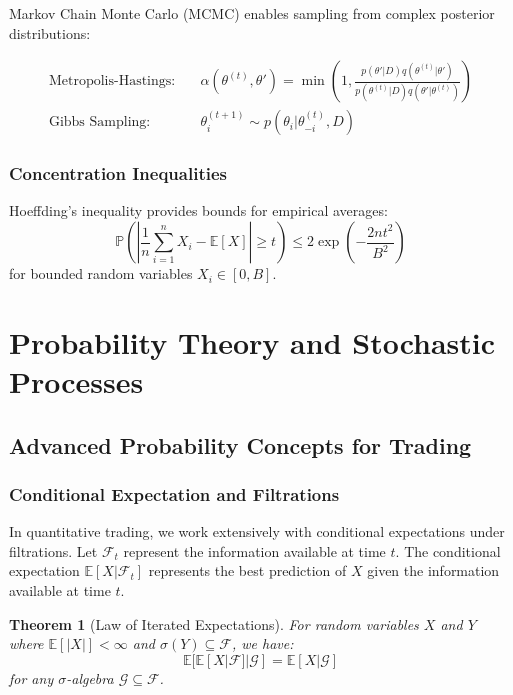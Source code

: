 \documentclass[11pt,letterpaper,openany]{book}
\newtheorem{theorem}{Theorem}[chapter]
\begin{document}
Markov Chain Monte Carlo (MCMC) enables sampling from complex posterior distributions:

\begin{align}
\text{Metropolis-Hastings:} \quad & \alpha(\theta^{(t)}, \theta') = \min\left(1, \frac{p(\theta'|D) q(\theta^{(t)}|\theta')}{p(\theta^{(t)}|D) q(\theta'|\theta^{(t)})}\right) \\
\text{Gibbs Sampling:} \quad & \theta_i^{(t+1)} \sim p(\theta_i | \theta_{-i}^{(t)}, D)
\end{align}

\subsubsection{Concentration Inequalities}

Hoeffding's inequality provides bounds for empirical averages:
\[
\mathbb{P}\left( \left| \frac{1}{n} \sum_{i=1}^n X_i - \mathbb{E}[X] \right| \geq t \right) \leq 2\exp\left( -\frac{2n t^2}{B^2} \right)
\]
for bounded random variables $X_i \in [0, B]$.

\section{Probability Theory and Stochastic Processes}

\subsection{Advanced Probability Concepts for Trading}

\subsubsection{Conditional Expectation and Filtrations}

In quantitative trading, we work extensively with conditional expectations under filtrations. Let $\mathcal{F}_t$ represent the information available at time $t$. The conditional expectation $\mathbb{E}[X|\mathcal{F}_t]$ represents the best prediction of $X$ given the information available at time $t$.

\begin{theorem}[Law of Iterated Expectations]
For random variables $X$ and $Y$ where $\mathbb{E}[|X|] < \infty$ and $\sigma(Y) \subseteq \mathcal{F}$, we have:
\[
\mathbb{E}[\mathbb{E}[X|\mathcal{F}] | \mathcal{G}] = \mathbb{E}[X | \mathcal{G}]
\]
for any $\sigma$-algebra $\mathcal{G} \subseteq \mathcal{F}$.
\end{theorem}
\end{document}

